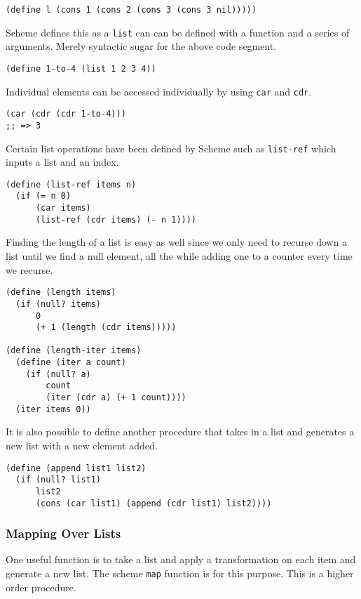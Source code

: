 \documentclass[11pt]{article}
\begin{document}
\begin{verbatim}
(define l (cons 1 (cons 2 (cons 3 (cons 3 nil)))))
\end{verbatim}

Scheme defines this as a \texttt{list} can can be defined with a function and a
series of arguments. Merely syntactic sugar for the above code segment.

\begin{verbatim}
(define 1-to-4 (list 1 2 3 4))
\end{verbatim}

Individual elements can be accessed individually by using \texttt{car} and
\texttt{cdr}.

\begin{verbatim}
(car (cdr (cdr 1-to-4)))
;; => 3
\end{verbatim}

Certain list operations have been defined by Scheme such as \texttt{list-ref}
which inputs a list and an index.

\begin{verbatim}
(define (list-ref items n)
  (if (= n 0)
      (car items)
      (list-ref (cdr items) (- n 1))))
\end{verbatim}

Finding the length of a list is easy as well since we only need to
recurse down a list until we find a null element, all the while adding
one to a counter every time we recurse.

\begin{verbatim}
(define (length items)
  (if (null? items)
      0
      (+ 1 (length (cdr items)))))

(define (length-iter items)
  (define (iter a count)
    (if (null? a)
        count
        (iter (cdr a) (+ 1 count))))
  (iter items 0))
\end{verbatim}

It is also possible to define another procedure that takes in a list and
generates a new list with a new element added.

\begin{verbatim}
(define (append list1 list2)
  (if (null? list1)
      list2
      (cons (car list1) (append (cdr list1) list2))))
\end{verbatim}

\subsubsection{Mapping Over Lists}
\label{sec:orgd0866b6}
One useful function is to take a list and apply a transformation on each
item and generate a new list. The scheme \texttt{map} function is for this
purpose. This is a higher order procedure.
\end{document}
